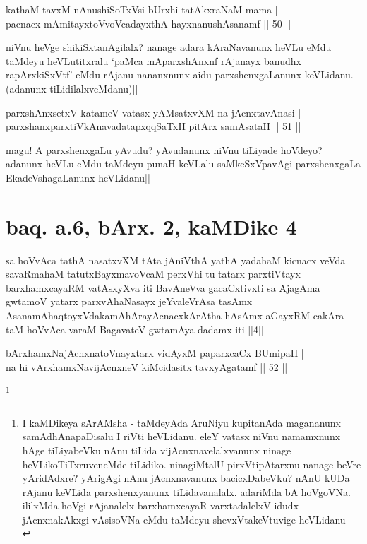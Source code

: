 \begin{shl}
kathaM tavxM nAnushiSoTxV\s si bUrxhi tatAkxraNaM mama | \\
pacnacx mAmitayxtoV\s voVcadayxthA hayxnanushAsanamf \hfill|| 50 || 
\end{shl}

\begin{artha}
niVnu heVge shikiSxtanAgilalx? nanage adara kAraNavanunx heVLu eMdu 
taMdeyu heVLutitxralu `paMca mAparxshAnxnf rAjanayx banudhx 
rapArxkiSxVtf' eMdu rAjanu nananxnunx aidu parxshenxgaLanunx 
keVLidanu. (adanunx tiLidilalxveMdanu)||
\end{artha}

\begin{shl}
parxshAnxsetxV katameV vatasx yAMsatxvXM na jAcnxtavAnasi | \\
parxshanxparxtiVkAnavadatapxqqSaTxH pitArx samAsataH \hfill|| 51 || 
\end{shl}

\begin{artha}
magu! A parxshenxgaLu yAvudu? yAvudanunx niVnu tiLiyade hoVdeyo? 
adanunx heVLu eMdu taMdeyu punaH keVLalu saMkeSxVpavAgi parxshenxgaLa 
EkadeVshagaLanunx heVLidanu||
\end{artha}

\section*{baq. a.6, bArx. 2, kaMDike 4}

\begin{shl}
sa hoVvAca tathA nasatxvXM tAta jAniVthA yathA yadahaM kicnacx veVda savaRmahaM tatutxBayxmavoVcaM perxVhi tu tatarx parxtiVtayx barxhamxcayaRM vatAsxyXva iti BavAneVva gacaCxtivxti sa AjagAma gwtamoV yatarx parxvAhaNasayx jeYvaleVrAsa tasAmx AsanamAhaqtoyxVdakamAhArayAcnacxkArAtha hAsAmx aGayxRM cakAra taM hoVvAca varaM BagavateV gwtamAya dadamx iti ||4||
\end{shl}

\begin{shl}
bArxhamxNajAcnxnatoV\s nayxtarx vidAyxM paparxcaCx BUmipaH | \\
na hi vArxhamxNavijAcnxneV kiMcidasitx tavxyA\s gatamf \hfill|| 52 || 
\end{shl}

\footnote[1]{I kaMDikeya sArAMsha - taMdeyAda AruNiyu kupitanAda 
magananunx samAdhAnapaDisalu I riVti heVLidanu. eleY vatasx niVnu 
namamxnunx hAge tiLiyabeVku nAnu tiLida vijAcnxnavelalxvanunx ninage 
heVLikoTiTxruveneMde tiLidiko. ninagiMtalU pirxVtipAtarxnu nanage 
beVre yAridAdxre? yArigAgi nAnu jAcnxnavanunx bacicxDabeVku? nAnU kUDa 
rAjanu keVLida parxshenxyanunx tiLidavanalalx. adariMda bA hoVgoVNa. 
ililxMda hoVgi rAjanalelx barxhamxcayaR varxtadalelxV idudx 
jAcnxnakAkxgi vAsisoVNa eMdu taMdeyu shevxVtakeVtuvige heVLidanu --}\stext


